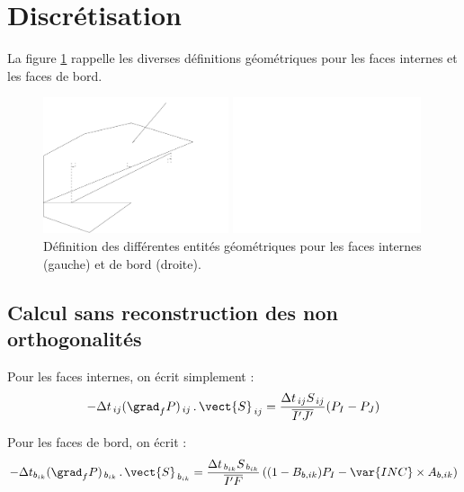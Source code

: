 \section{Discr\'etisation}

La figure \ref{Base_Itrmas_fig_geom} rappelle les diverses d\'efinitions g\'eom\'etriques
pour les faces internes et les faces de bord.

\begin{figure}[h]
\parbox{8cm}{%
\centerline{\includegraphics[height=4cm]{../Base/Itrmas/Images/facette.pdf}}}
\parbox{8cm}{%
\centerline{\includegraphics[height=4cm]{../Base/Itrmas/Images/facebord.pdf}}}
\caption{\label{Base_Itrmas_fig_geom}D\'efinition des diff\'erentes entit\'es
g\'eom\'etriques pour les faces internes (gauche) et de bord (droite).}
\end{figure}


\subsection{Calcul sans reconstruction des non orthogonalit\'es}
Pour les faces internes, on \'ecrit simplement :
\begin{equation}
\label{Base_Itrmas_eq_intssrec}
-\Delta t_{\,ij}(\grad_f P)_{\,ij}\,.\,\vect{S}_{\,ij}=
\frac{\Delta t_{\,ij}S_{\,ij}}{\overline{I^\prime J^\prime}}(P_I-P_J)
\end{equation}

Pour les faces de bord, on \'ecrit :
\begin{equation}
\label{Base_Itrmas_eq_brdssrec}
-\Delta t_{b_{ik}}(\grad_f P)_{\,b_{ik}}\,.\,\vect{S}_{\,b_{ik}}=
\frac{\Delta t_{\,b_{ik}}S_{\,b_{ik}}}{\overline{I^\prime F}}
\left((1-B_{b,ik})P_I-\var{INC}\times A_{b,ik}\right)
\end{equation}

